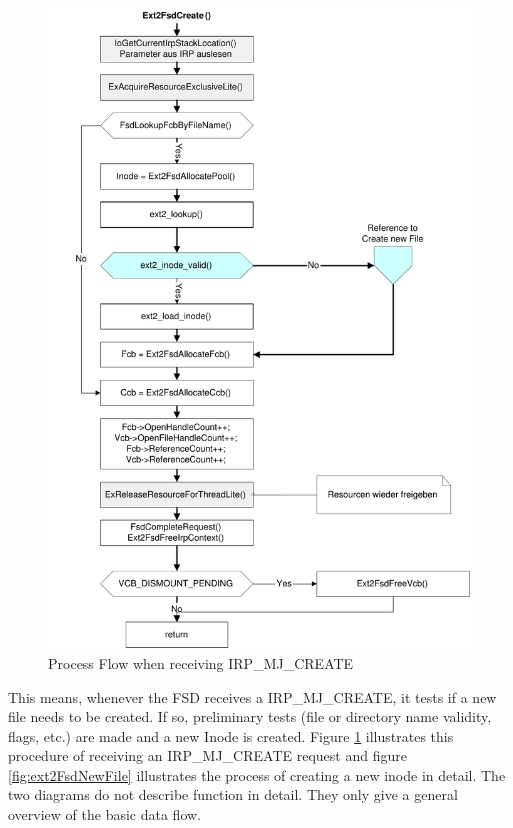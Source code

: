 \begin{figure}[H]
\begin{center}
\includegraphics[height=\textheight]{./files/inc/pdf/Ext2FsdCreate}
\end{center}
\caption{\label{fig:ext2FsdCreate}Process Flow when receiving IRP\_MJ\_CREATE}
\end{figure}

\noindent
This means, whenever the FSD receives a IRP\_MJ\_CREATE, it tests if a new file needs to be created. If so, preliminary tests (file or directory name validity, flags, etc.) are made and a new Inode is created. Figure \ref{fig:ext2FsdCreate} illustrates this procedure of receiving an IRP\_MJ\_CREATE request and figure \ref{fig:ext2FsdNewFile} illustrates the process of creating a new inode in detail. The two diagrams do not describe function in detail. They only give a general overview of the basic data flow.

